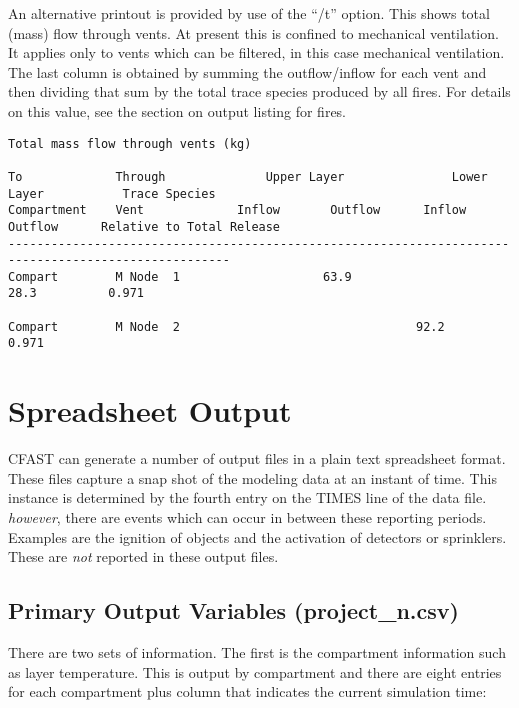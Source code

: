 An alternative printout is provided by use of the ``/t'' option. This shows total (mass) flow through vents. At present this is confined to mechanical ventilation. It applies only to vents which can be filtered, in this case mechanical ventilation. The last column is obtained by summing the outflow/inflow for each vent and then dividing that sum by the total trace species produced by all fires. For details on this value, see the section on output listing for fires.

\begin{lstlisting}[basicstyle=\tiny]
Total mass flow through vents (kg)

To             Through              Upper Layer               Lower Layer           Trace Species
Compartment    Vent             Inflow       Outflow      Inflow       Outflow      Relative to Total Release
-----------------------------------------------------------------------------------------------------
Compart        M Node  1                    63.9                      28.3          0.971

Compart        M Node  2                                 92.2                       0.971
\end{lstlisting}

\section{Spreadsheet Output}

CFAST can generate a number of output files in a plain text spreadsheet format.  These files capture a snap shot of the modeling data at an instant of time. This instance is determined by the fourth entry on the TIMES line of the data file. \emph{however}, there are events which can occur in between these reporting periods. Examples are the ignition of objects and the activation of detectors or sprinklers. These are \emph{not} reported in these output files.

\subsection{Primary Output Variables (project\_n.csv)}

There are two sets of information. The first is the compartment information such as layer temperature. This is output by compartment and there are eight entries for each compartment plus column that indicates the current simulation time:

